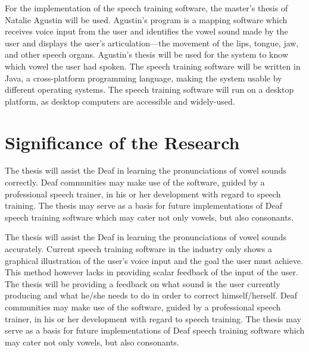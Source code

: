 For the implementation of the speech training software, the master's thesis of Natalie Agustin \citeyear{agustin:2014:SOM} will be used. Agustin's program is a mapping software which receives voice input from the user and identifies the vowel sound made by the user and displays the user’s articulation---the movement of the lips, tongue, jaw, and other speech organs. Agustin's thesis will be used for the system to know which vowel the user had spoken.
The speech training software will be written in Java, a cross-platform programming language, making the system usable by different operating systems.
The speech training software will run on a desktop platform, as desktop computers are accessible and widely-used.

\section{Significance of the Research}
\label{sec:significance}

The thesis will assist the Deaf in learning the pronunciations of vowel sounds correctly. Deaf communities may make use of the software, guided by a professional speech trainer, in his or her development with regard to speech training.
The thesis may serve as a basis for future implementations of Deaf speech training software which may cater not only vowels, but also consonants.

The thesis will assist the Deaf in learning the pronunciations of vowel sounds accurately. Current speech training software in the industry only shows a graphical illustration of the user's voice input and the goal the user must achieve. This method however lacks in providing scalar feedback of the input of the user. The thesis will be providing a feedback on what sound is the user currently producing and what he/she needs to do in order to correct himself/herself. Deaf communities may make use of the software, guided by a professional speech trainer, in his or her development with regard to speech training. The thesis may serve as a basis for future implementations of Deaf speech training software which may cater not only vowels, but also consonants.